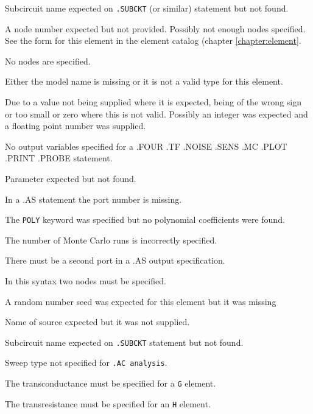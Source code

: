 Subcircuit name expected on {\tt .SUBCKT} (or similar) statement but not found.

A node number expected but not provided. Possibly not enough nodes specified.
See the form for this element in the element catalog (chapter \ref{chapter:element}.

No nodes are specified.

Either the model name is missing or it is not a valid type for this element.

Due to a value not being supplied where it is expected, being of the wrong sign
or too small or zero where this is not valid.
Possibly an integer was expected and a floating point number was supplied.

No output variables specified for a
.FOUR .TF .NOISE .SENS .MC .PLOT .PRINT .PROBE statement.

Parameter expected but not found.

In a .AS statement the port number is missing.

The {\tt POLY} keyword was specified but no polynomial coefficients were found.

The number of Monte Carlo runs is incorrectly specified.

There must be a second port in a .AS output specification.

In this syntax two nodes must be specified.

A random number seed was expected for this element but it was missing

Name of source expected but it was not supplied.

Subcircuit name expected on {\tt .SUBCKT} statement but not found.

Sweep type not specified for {\tt .AC analysis}.

The transconductance must be specified for a {\tt G} element.

The transresistance must be specified for an {\tt H} element.

